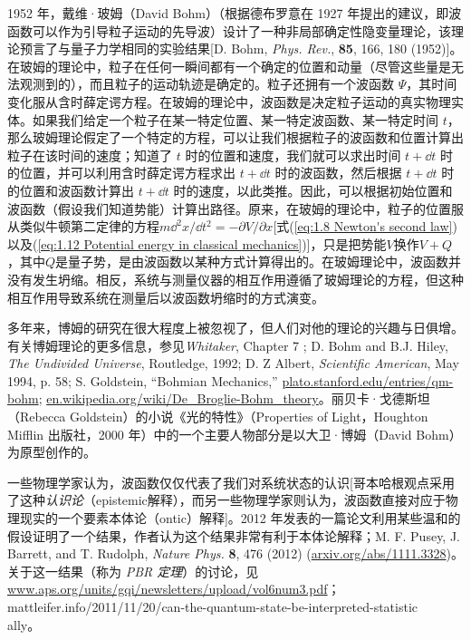     1952 年，戴维·玻姆（David Bohm）（根据德布罗意在 1927 年提出的建议，即波函数可以作为引导粒子运动的先导波）设计了一种非局部确定性隐变量理论，该理论预言了与量子力学相同的实验结果[D. Bohm, \textit{Phys. Rev.}, \textbf{85}, 166, 180 (1952)]。在玻姆的理论中，粒子在任何一瞬间都有一个确定的位置和动量（尽管这些量是无法观测到的），而且粒子的运动轨迹是确定的。粒子还拥有一个波函数 $\Psi$，其时间变化服从含时薛定谔方程。在玻姆的理论中，波函数是决定粒子运动的真实物理实体。如果我们给定一个粒子在某一特定位置、某一特定波函数、某一特定时间 $t$，那么玻姆理论假定了一个特定的方程，可以让我们根据粒子的波函数和位置计算出粒子在该时间的速度；知道了 $t$ 时的位置和速度，我们就可以求出时间 $t+\dd t$ 时的位置，并可以利用含时薛定谔方程求出 $t+\dd t$ 时的波函数，然后根据 $t+\dd t$ 时的位置和波函数计算出 $t+\dd t$ 时的速度，以此类推。因此，可以根据初始位置和波函数（假设我们知道势能）计算出路径。原来，在玻姆的理论中，粒子的位置服从类似牛顿第二定律的方程$m \dd ^2x/\dd t^2 = -\partial V /\partial x$[式(\ref{eq:1.8 Newton's second law})以及(\ref{eq:1.12 Potential energy in classical mechanics})]，只是把势能$V$换作$V+Q$，其中$Q$是量子势，是由波函数以某种方式计算得出的。在玻姆理论中，波函数并没有发生坍缩。相反，系统与测量仪器的相互作用遵循了玻姆理论的方程，但这种相互作用导致系统在测量后以波函数坍缩时的方式演变。

    多年来，博姆的研究在很大程度上被忽视了，但人们对他的理论的兴趣与日俱增。有关博姆理论的更多信息，参见\textit{Whitaker}, Chapter 7 ; D. Bohm and B.J. Hiley, \textit{The Undivided Universe}, Routledge, 1992; D. Z Albert, \textit{Scientific American}, May 1994, p. 58; S. Goldstein, “Bohmian Mechanics,” \url{plato.stanford.edu/entries/qm-bohm}; \url{en.wikipedia.org/wiki/De_Broglie-Bohm_theory}。丽贝卡·戈德斯坦（Rebecca Goldstein）的小说《光的特性》（Properties of Light，Houghton Mifflin 出版社，2000 年）中的一个主要人物部分是以大卫·博姆（David Bohm）为原型创作的。

    一些物理学家认为，波函数仅仅代表了我们对系统状态的认识[哥本哈根观点采用了这种\textit{认识论}（epistemic解释），而另一些物理学家则认为，波函数直接对应于物理现实的一个要素本体论（ontic）解释]。2012 年发表的一篇论文利用某些温和的假设证明了一个结果，作者认为这个结果非常有利于本体论解释；M. F. Pusey, J. Barrett, and T. Rudolph, \textit{Nature Phys.} \textbf{8}, 476 (2012) (\url{arxiv.org/abs/1111.3328})。关于这一结果（称为 \textit{PBR 定理}）的讨论，见 \url{www.aps.org/units/gqi/newsletters/upload/vol6num3.pdf}；mattleifer.info/2011/11/20/can-the-quantum-state-be-interpreted-statistic\\ally。

